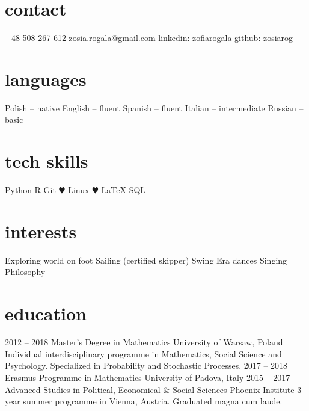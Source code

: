 \documentclass[]{appsilon} %
\begin{document}

\begin{sidebar} %
\section{contact}
+48 508 267 612
\href{mailto:zosia.rogala@gmail.com}{zosia.rogala@gmail.com}
\href{http://linkedin.com/in/zofiarogala}{linkedin: zofiarogala}
\href{https://github.com/ZosiaRog}{github: zosiarog}
\section{languages}
Polish -- native
English -- fluent
Spanish -- fluent
Italian -- intermediate
Russian -- basic

\section{tech skills}
Python
R
Git
{\color{green} $\varheartsuit$} Linux
{\color{red} $\varheartsuit$} \LaTeX
SQL

\section{interests}
Exploring world on foot
Sailing (certified skipper)
Swing Era dances
Singing
Philosophy
\end{sidebar}



\section{education}

\begin{entrylist}
	\entry
	{2012 -- 2018}
	{Master's Degree in Mathematics}
	{University of Warsaw, Poland}
	{Individual interdisciplinary programme in Mathematics, Social Science and Psychology. Specialized in Probability and Stochastic Processes.}
	\entry
	{2017 -- 2018}
	{Erasmus Programme in Mathematics}
	{University of Padova, Italy}
	{\vspace{-0.4cm}}
	\entry
	{2015 -- 2017}
	{Advanced Studies in Political, Economical \& Social Sciences}
	{Phoenix Institute}
	{3-year summer programme in Vienna, Austria. Graduated magna cum laude.}
\end{entrylist}
\end{document}
